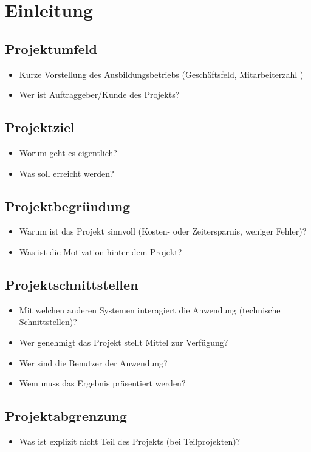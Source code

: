 \section{Einleitung}
\label{sec:Einleitung}


\subsection{Projektumfeld} 
\label{sec:Projektumfeld}
\begin{itemize}
	\item Kurze Vorstellung des Ausbildungsbetriebs (Geschäftsfeld, Mitarbeiterzahl \usw)
	\item Wer ist Auftraggeber/Kunde des Projekts?
\end{itemize}


\subsection{Projektziel} 
\label{sec:Projektziel}
\begin{itemize}
	\item Worum geht es eigentlich?
	\item Was soll erreicht werden?
\end{itemize}


\subsection{Projektbegründung} 
\label{sec:Projektbegruendung}
\begin{itemize}
	\item Warum ist das Projekt sinnvoll (\zB Kosten- oder Zeitersparnis, weniger Fehler)?
	\item Was ist die Motivation hinter dem Projekt?
\end{itemize}


\subsection{Projektschnittstellen} 
\label{sec:Projektschnittstellen}
\begin{itemize}
	\item Mit welchen anderen Systemen interagiert die Anwendung (technische Schnittstellen)?
	\item Wer genehmigt das Projekt \bzw stellt Mittel zur Verfügung? 
	\item Wer sind die Benutzer der Anwendung?
	\item Wem muss das Ergebnis präsentiert werden?
\end{itemize}


\subsection{Projektabgrenzung} 
\label{sec:Projektabgrenzung}
\begin{itemize}
	\item Was ist explizit nicht Teil des Projekts (\insb bei Teilprojekten)?
\end{itemize}
